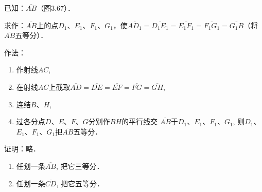 \begin{example}
    已知：$\overline{AB}$（图3.67）．

求作：$\overline{AB}$上的点$D_1$、$E_1$、$F_1$、$G_1$，使$\overline{AD_1}=\overline{D_1E_1}=\overline{E_1F_1}=\overline{F_1G_1}=\overline{G_1B}$（将$\overline{AB}$五等分）．

作法：
\begin{enumerate}
    \item  作射线$AC$,
    \item  在射线$AC$上截取$\overline{AD}=\overline{DE}=\overline{EF}=\overline{FG}=\overline{GH}$,
    \item  连结$B$、$H$,
    \item  过各分点$D$、$E$、$F$、$G$分别作$BH$的平行线交
$\overline{AB}$于$D_1$、$E_1$、$F_1$、$G_1$, 则$D_1$、$E_1$、$F_1$、$G_1$把$\overline{AB}$五等分．
\end{enumerate}

证明：略．
\end{example}

\begin{ex}
\begin{enumerate}
    \item 任划一条$\overline{AB}$, 把它三等分．
    \item 任划一条$\overline{CD}$, 把它五等分．
\end{enumerate}
\end{ex}

